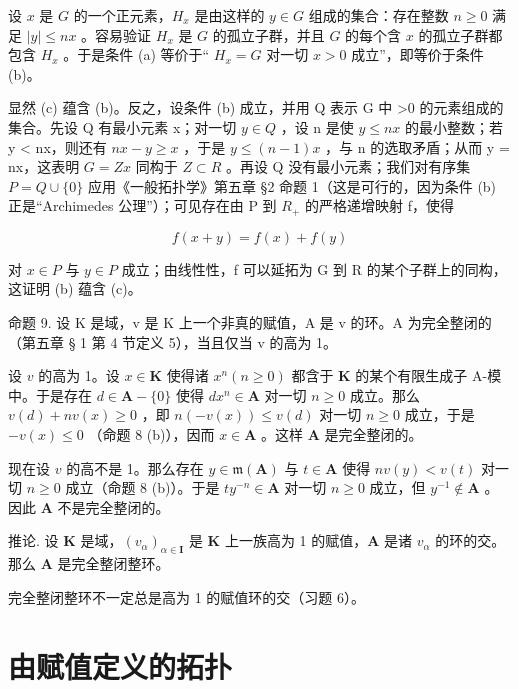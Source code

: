 设 \(x\) 是 \(G\) 的一个正元素，\(H_x\) 是由这样的 \(y \in G\) 组成的集合：存在整数 \(n \geqslant 0\) 满足 \(|y| \leqslant nx\) 。容易验证 \(H_x\) 是 \(G\) 的孤立子群，并且 \(G\) 的每个含 \(x\) 的孤立子群都包含 \(H_x\) 。于是条件 (a) 等价于“ \(H_x = G\) 对一切 \(x > 0\) 成立”，即等价于条件 (b)。

显然 (c) 蕴含 (b)。反之，设条件 (b) 成立，并用 Q 表示 G 中 >0 的元素组成的集合。先设 Q 有最小元素 x；对一切 \(y \in Q\) ，设 n 是使 \(y \leqslant nx\) 的最小整数；若 y < nx，则还有 \(nx - y \geqslant x\) ，于是 \(y \leqslant (n - 1)x\) ，与 n 的选取矛盾；从而 y = nx，这表明 \(G = Zx\) 同构于 \(Z \subset R\) 。再设 Q 没有最小元素；我们对有序集 \(P = Q \cup \{0\}\) 应用《一般拓扑学》第五章 §2 命题 1（这是可行的，因为条件 (b) 正是“Archimedes 公理”）；可见存在由 P 到 \(R_{+}\) 的严格递增映射 f，使得

\[
f (x + y) = f (x) + f (y)
\]

对 \(x \in P\) 与 \(y \in P\) 成立；由线性性，f 可以延拓为 G 到 R 的某个子群上的同构，这证明 (b) 蕴含 (c)。

命题 9. 设 K 是域，v 是 K 上一个非真的赋值，A 是 v 的环。A 为完全整闭的（第五章 § 1 第 4 节定义 5），当且仅当 v 的高为 1。

设 \(v\) 的高为 1。设 \(x \in \mathbf{K}\) 使得诸 \(x^n (n \geqslant 0)\) 都含于 \(\mathbf{K}\) 的某个有限生成子 A-模中。于是存在 \(d \in \mathbf{A} - \{0\}\) 使得 \(dx^n \in \mathbf{A}\) 对一切 \(n \geqslant 0\) 成立。那么 \(v(d) + nv(x) \geqslant 0\) ，即 \(n(-v(x)) \leqslant v(d)\) 对一切 \(n \geqslant 0\) 成立，于是 \(-v(x) \leqslant 0\) （命题 8 (b)），因而 \(x \in \mathbf{A}\) 。这样 \(\mathbf{A}\) 是完全整闭的。

现在设 \(v\) 的高不是 1。那么存在 \(y \in \mathfrak{m}(\mathbf{A})\) 与 \(t \in \mathbf{A}\) 使得 \(nv(y) < v(t)\) 对一切 \(n \geqslant 0\) 成立（命题 8 (b)）。于是 \(ty^{-n} \in \mathbf{A}\) 对一切 \(n \geqslant 0\) 成立，但 \(y^{-1} \notin \mathbf{A}\) 。因此 \(\mathbf{A}\) 不是完全整闭的。

推论. 设 \(\mathbf{K}\) 是域，\((v_{\alpha})_{\alpha \in \mathbf{I}}\) 是 \(\mathbf{K}\) 上一族高为 1 的赋值，\(\mathbf{A}\) 是诸 \(v_{\alpha}\) 的环的交。那么 \(\mathbf{A}\) 是完全整闭整环。

完全整闭整环不一定总是高为 1 的赋值环的交（习题 6）。

\section{由赋值定义的拓扑}

